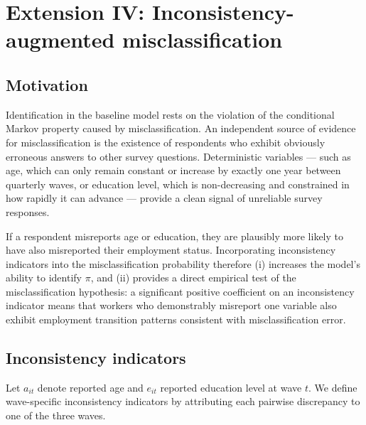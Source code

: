 \documentclass[12pt]{article}
\begin{document}
\section{Extension IV: Inconsistency-augmented misclassification}
\label{sec:inconsistencies}

\subsection{Motivation}

Identification in the baseline model rests on the violation of the
conditional Markov property caused by misclassification. An independent
source of evidence for misclassification is the existence of respondents
who exhibit obviously erroneous answers to other survey questions.
Deterministic variables --- such as age, which can only remain constant
or increase by exactly one year between quarterly waves, or education
level, which is non-decreasing and constrained in how rapidly it can
advance --- provide a clean signal of unreliable survey responses.

If a respondent misreports age or education, they are plausibly more
likely to have also misreported their employment status. Incorporating
inconsistency indicators into the misclassification probability
therefore (i) increases the model's ability to identify \(\pi\), and
(ii) provides a direct empirical test of the misclassification
hypothesis: a significant positive coefficient on an inconsistency
indicator means that workers who demonstrably misreport one variable
also exhibit employment transition patterns consistent with
misclassification error.

\subsection{Inconsistency indicators}
\label{sec:incons_indicators}

Let \(a_{it}\) denote reported age and \(e_{it}\) reported education
level at wave \(t\). We define wave-specific inconsistency indicators
by attributing each pairwise discrepancy to one of the three waves.
\end{document}
